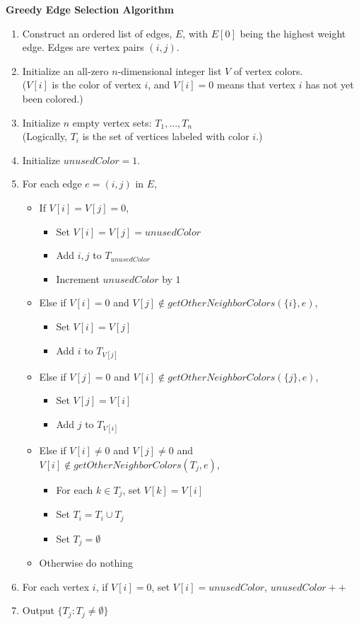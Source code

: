 \documentclass{article} %
\begin{document}
\begin{framed}
\noindent\textbf{Greedy Edge Selection Algorithm}
\begin{enumerate}
\item Construct an ordered list of edges, $E$, with $E[0]$ being the highest weight edge. Edges are vertex pairs $(i,j)$.
\item Initialize an all-zero $n$-dimensional integer list $V$ of vertex colors. \\
($V[i]$ is the color of vertex $i$, and $V[i]=0$ means that vertex $i$ has not yet been colored.)
\item Initialize $n$ empty vertex sets: $T_1,...,T_n$\\
(Logically, $T_i$ is the set of vertices labeled with color $i$.)
\item Initialize $unusedColor=1$.
\item For each edge $e=(i,j)$ in $E$,
\begin{itemize}
\item If $V[i]=V[j]=0$,
\begin{itemize}
\item Set $V[i]=V[j]=unusedColor$
\item Add $i,j$ to $T_{unusedColor}$
\item Increment $unusedColor$ by $1$
\end{itemize}
\item Else if $V[i]=0$ and $V[j]\notin getOtherNeighborColors(\{i\}, e)$,
\begin{itemize}
\item Set $V[i]=V[j]$
\item Add $i$ to $T_{V[j]}$
\end{itemize}
\item Else if $V[j]=0$ and $V[i]\notin getOtherNeighborColors(\{j\}, e)$,
\begin{itemize}
\item Set $V[j]=V[i]$
\item Add $j$ to $T_{V[i]}$
\end{itemize}
\item Else if  $V[i]\neq 0$ and $V[j]\neq 0$ and $V[i]\notin getOtherNeighborColors(T_j, e)$,
\begin{itemize}
\item For each $k\in T_j$, set $V[k]=V[i]$
\item Set $T_i=T_i\cup T_j$
\item Set $T_j=\emptyset$
\end{itemize}
\item Otherwise do nothing
\end{itemize}
\item For each vertex $i$, if $V[i]=0$, set $V[i]=unusedColor$, $unusedColor++$
\item Output $\{T_j:T_j\neq\emptyset\}$
\end{enumerate}
\vspace{10mm}


\end{framed}
\end{document}
